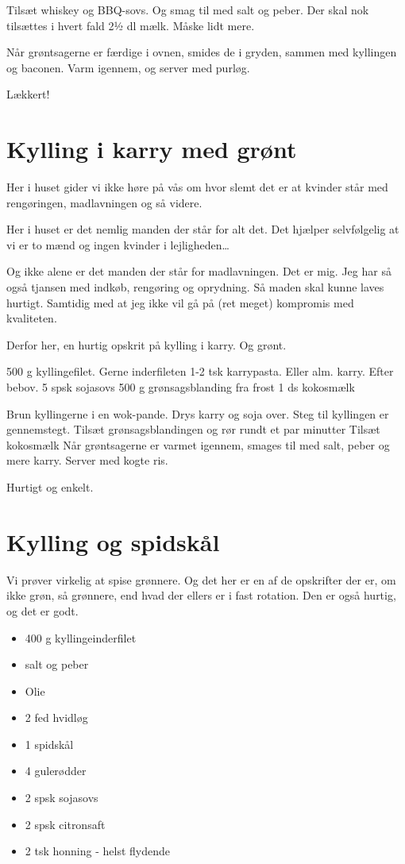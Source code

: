 \documentclass[
]{book}
\providecommand{\tightlist}{%
  \setlength{\itemsep}{0pt}\setlength{\parskip}{0pt}}
\begin{document}
Tilsæt whiskey og BBQ-sovs. Og smag til med salt og peber. Der skal nok tilsættes i hvert fald 2½ dl mælk. Måske lidt mere.

Når grøntsagerne er færdige i ovnen, smides de i gryden, sammen med kyllingen og baconen. Varm igennem, og server med purløg.

Lækkert!

\hypertarget{kylling-i-karry-med-gruxf8nt}{%
\section{Kylling i karry med grønt}\label{kylling-i-karry-med-gruxf8nt}}

Her i huset gider vi ikke høre på vås om hvor slemt det er at kvinder står med rengøringen, madlavningen og så videre.

Her i huset er det nemlig manden der står for alt det. Det hjælper selvfølgelig at vi er to mænd og ingen kvinder i lejligheden\ldots{}

Og ikke alene er det manden der står for madlavningen. Det er mig. Jeg har så også tjansen med indkøb, rengøring og oprydning. Så maden skal kunne laves hurtigt. Samtidig med at jeg ikke vil gå på (ret meget) kompromis med kvaliteten.

Derfor her, en hurtig opskrit på kylling i karry. Og grønt.

500 g kyllingefilet. Gerne inderfileten
1-2 tsk karrypasta. Eller alm. karry. Efter bebov.
5 spsk sojasovs
500 g grønsagsblanding fra frost
1 ds kokosmælk

Brun kyllingerne i en wok-pande. Drys karry og soja over.
Steg til kyllingen er gennemstegt.
Tilsæt grønsagsblandingen og rør rundt et par minutter
Tilsæt kokosmælk
Når grøntsagerne er varmet igennem, smages til med salt, peber og mere karry.
Server med kogte ris.

Hurtigt og enkelt.

\hypertarget{kylling-og-spidskuxe5l}{%
\section{Kylling og spidskål}\label{kylling-og-spidskuxe5l}}

Vi prøver virkelig at spise grønnere. Og det her er en af de opskrifter der er, om ikke grøn, så grønnere, end hvad der ellers er i fast rotation. Den er også hurtig, og det er godt.

\begin{itemize}
\tightlist
\item
  400 g kyllingeinderfilet
\item
  salt og peber
\item
  Olie
\item
  2 fed hvidløg
\item
  1 spidskål
\item
  4 gulerødder
\item
  2 spsk sojasovs
\item
  2 spsk citronsaft
\item
  2 tsk honning - helst flydende
\end{itemize}
\end{document}
